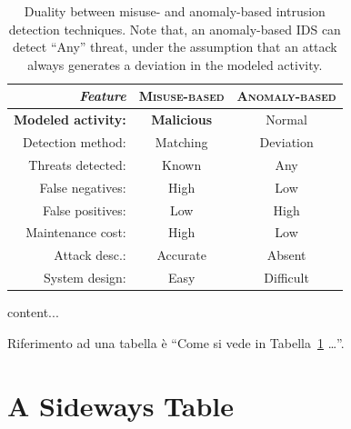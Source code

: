 \begin{table}[h]
\centering
\begin{tabular}{rcc}
\toprule \emph{Feature} & \textsc{Misuse-based} &
\textsc{Anomaly-based}\\

\midrule \textbf{Modeled activity:} & \textbf{Malicious} & Normal\\
Detection method: & Matching & Deviation\\
Threats detected: & Known & Any\\
False negatives: & High & Low\\
False positives: & Low & High\\
Maintenance cost: & High & Low\\
Attack desc.: & Accurate & Absent\\
System design: & Easy & Difficult\\
\bottomrule
\end{tabular}
\caption[Duality between misuse- and anomaly-based intrusion detection techniques.]{Duality between misuse- and anomaly-based intrusion detection techniques. Note that, an anomaly-based \ac{IDS} can detect ``Any'' threat, under the assumption that an attack always generates a deviation in the modeled activity.}
\label{tab:misuse-vs-anomaly} %
\end{table}

\begin{table}
content...
\end{table}

Riferimento ad una tabella è  ``Come si vede in Tabella~\ref{tab:misuse-vs-anomaly} \ldots''.



\section{A Sideways Table}

